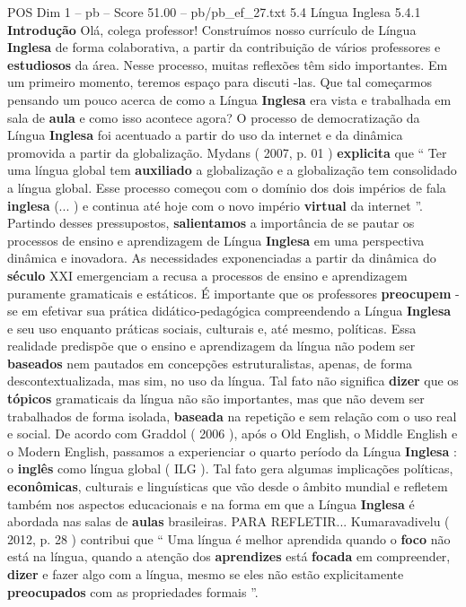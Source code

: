 \begin{textsample}{POS Dim 1 – pb – Score 51.00 – pb/pb\_ef\_27.txt}  \label{ex:f1_pos_150}
5.4 Língua Inglesa 5.4.1 \textbf{Introdução} Olá, colega professor!
Construímos nosso currículo de Língua \textbf{Inglesa} de forma colaborativa, a partir da contribuição de vários professores e \textbf{estudiosos} da área.
Nesse processo, muitas reflexões têm sido importantes.
Em um primeiro momento, teremos espaço para discuti -las.
Que tal começarmos pensando um pouco acerca de como a Língua \textbf{Inglesa} era vista e trabalhada em sala de \textbf{aula} e como isso acontece agora?
O processo de democratização da Língua \textbf{Inglesa} foi acentuado a partir do uso da internet e da dinâmica promovida a partir da globalização.
Mydans ( 2007, p. 01 ) \textbf{explicita} que “ Ter uma língua global tem \textbf{auxiliado} a globalização e a globalização tem consolidado a língua global.
Esse processo começou com o domínio dos dois impérios de fala \textbf{inglesa} (... ) e continua até hoje com o novo império \textbf{virtual} da internet ”.
Partindo desses pressupostos, \textbf{salientamos} a importância de se pautar os processos de ensino e aprendizagem de Língua \textbf{Inglesa} em uma perspectiva dinâmica e inovadora.
As necessidades exponenciadas a partir da dinâmica do \textbf{século} XXI emergenciam a recusa a processos de ensino e aprendizagem puramente gramaticais e estáticos.
É importante que os professores \textbf{preocupem} -se em efetivar sua prática didático-pedagógica compreendendo a Língua \textbf{Inglesa} e seu uso enquanto práticas sociais, culturais e, até mesmo, políticas.
Essa realidade predispõe que o ensino e aprendizagem da língua não podem ser \textbf{baseados} nem pautados em concepções estruturalistas, apenas, de forma descontextualizada, mas sim, no uso da língua.
Tal fato não significa \textbf{dizer} que os \textbf{tópicos} gramaticais da língua não são importantes, mas que não devem ser trabalhados de forma isolada, \textbf{baseada} na repetição e sem relação com o uso real e social.
De acordo com Graddol ( 2006 ), após o Old English, o Middle English e o Modern English, passamos a experienciar o quarto período da Língua \textbf{Inglesa} : o \textbf{inglês} como língua global ( ILG ).
Tal fato gera algumas implicações políticas, \textbf{econômicas}, culturais e linguísticas que vão desde o âmbito mundial e refletem também nos aspectos educacionais e na forma em que a Língua \textbf{Inglesa} é abordada nas salas de \textbf{aulas} brasileiras.
PARA REFLETIR...
Kumaravadivelu ( 2012, p. 28 ) contribui que “ Uma língua é melhor aprendida quando o \textbf{foco} não está na língua, quando a atenção dos \textbf{aprendizes} está \textbf{focada} em compreender, \textbf{dizer} e fazer algo com a língua, mesmo se eles não estão explicitamente \textbf{preocupados} com as propriedades formais ”.

\end{textsample}
